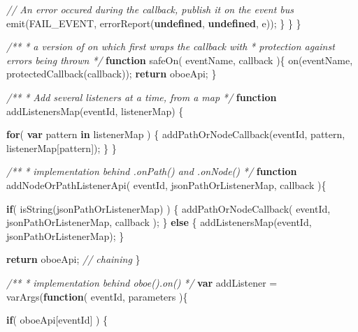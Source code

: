 \documentclass[12pt, ]{article}
\newenvironment{Shaded}{}{}
\newcommand{\KeywordTok}[1]{\textcolor[rgb]{0.00,0.44,0.13}{\textbf{{#1}}}}
\newcommand{\CommentTok}[1]{\textcolor[rgb]{0.38,0.63,0.69}{\textit{{#1}}}}
\newcommand{\FunctionTok}[1]{\textcolor[rgb]{0.02,0.16,0.49}{{#1}}}
\newcommand{\NormalTok}[1]{{#1}}
\begin{document}
\begin{Shaded}
\begin{Highlighting}[]
            \CommentTok{// An error occured during the callback, publish it on the event bus }
            \FunctionTok{emit}\NormalTok{(FAIL_EVENT, }\FunctionTok{errorReport}\NormalTok{(}\KeywordTok{undefined}\NormalTok{, }\KeywordTok{undefined}\NormalTok{, e));}
         \NormalTok{\}      }
      \NormalTok{\}   }
   \NormalTok{\}}

   \CommentTok{/** }
\CommentTok{    * a version of on which first wraps the callback with}
\CommentTok{    * protection against errors being thrown}
\CommentTok{    */}
   \KeywordTok{function} \FunctionTok{safeOn}\NormalTok{( eventName, callback )\{}
      \FunctionTok{on}\NormalTok{(eventName, }\FunctionTok{protectedCallback}\NormalTok{(callback));}
      \KeywordTok{return} \NormalTok{oboeApi;}
   \NormalTok{\}}
      
   \CommentTok{/**}
\CommentTok{    * Add several listeners at a time, from a map}
\CommentTok{    */}
   \KeywordTok{function} \FunctionTok{addListenersMap}\NormalTok{(eventId, listenerMap) \{}
   
      \KeywordTok{for}\NormalTok{( }\KeywordTok{var} \NormalTok{pattern }\KeywordTok{in} \NormalTok{listenerMap ) \{}
         \FunctionTok{addPathOrNodeCallback}\NormalTok{(eventId, pattern, listenerMap[pattern]);}
      \NormalTok{\}}
   \NormalTok{\}    }
      
   \CommentTok{/**}
\CommentTok{    * implementation behind .onPath() and .onNode()}
\CommentTok{    */}       
   \KeywordTok{function} \FunctionTok{addNodeOrPathListenerApi}\NormalTok{( eventId, jsonPathOrListenerMap, callback )\{}
   
      \KeywordTok{if}\NormalTok{( }\FunctionTok{isString}\NormalTok{(jsonPathOrListenerMap) ) \{}
         \FunctionTok{addPathOrNodeCallback}\NormalTok{( }
            \NormalTok{eventId, }
            \NormalTok{jsonPathOrListenerMap,}
            \NormalTok{callback}
         \NormalTok{);}
      \NormalTok{\} }\KeywordTok{else} \NormalTok{\{}
         \FunctionTok{addListenersMap}\NormalTok{(eventId, jsonPathOrListenerMap);}
      \NormalTok{\}}
      
      \KeywordTok{return} \NormalTok{oboeApi; }\CommentTok{// chaining}
   \NormalTok{\}}
      
   \CommentTok{/**}
\CommentTok{    * implementation behind oboe().on()}
\CommentTok{    */}       
   \KeywordTok{var} \NormalTok{addListener = }\FunctionTok{varArgs}\NormalTok{(}\KeywordTok{function}\NormalTok{( eventId, parameters )\{}

      \KeywordTok{if}\NormalTok{( oboeApi[eventId] ) \{}
      

\end{Highlighting}
\end{Shaded}
\end{document}
